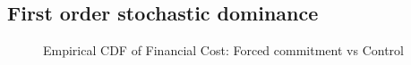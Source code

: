 \vspace{.3in}
\subsection{First order stochastic dominance} \label{App_FOSD}
\normalsize
\vspace{.2in}



\vspace{.2in}
\begin{figure}[H]
        \caption{Empirical CDF of Financial Cost: Forced commitment vs Control}
    \label{ecdf_fc}
    

\end{figure}
